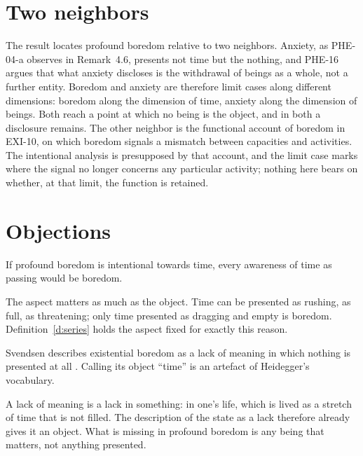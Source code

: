 \documentclass{situationist-preprint}
\begin{document}
\section{Two neighbors}

The result locates profound boredom relative to two neighbors. Anxiety, as PHE-04-a observes in Remark~4.6, presents not time but the nothing, and PHE-16 argues that what anxiety discloses is the withdrawal of beings as a whole, not a further entity. Boredom and anxiety are therefore limit cases along different dimensions: boredom along the dimension of time, anxiety along the dimension of beings. Both reach a point at which no being is the object, and in both a disclosure remains. The other neighbor is the functional account of boredom in EXI-10, on which boredom signals a mismatch between capacities and activities. The intentional analysis is presupposed by that account, and the limit case marks where the signal no longer concerns any particular activity; nothing here bears on whether, at that limit, the function is retained.

\section{Objections}

\begin{objection}
If profound boredom is intentional towards time, every awareness of time as passing would be boredom.
\end{objection}

\begin{reply}
The aspect matters as much as the object. Time can be presented as rushing, as full, as threatening; only time presented as dragging and empty is boredom. Definition~\ref{d:series} holds the aspect fixed for exactly this reason.
\end{reply}

\begin{objection}
Svendsen describes existential boredom as a lack of meaning in which nothing is presented at all \citep{Svendsen2005}. Calling its object \enquote{time} is an artefact of Heidegger's vocabulary.
\end{objection}

\begin{reply}
A lack of meaning is a lack in something: in one's life, which is lived as a stretch of time that is not filled. The description of the state as a lack therefore already gives it an object. What is missing in profound boredom is any being that matters, not anything presented.
\end{reply}
\end{document}
